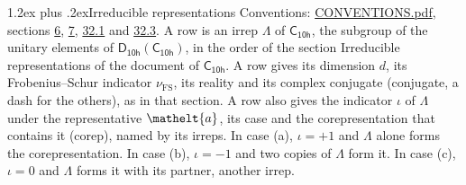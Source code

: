 \documentclass[10pt,a4paper]{article}
\makeatletter
\renewcommand\section{\@startsection{section}{1}{\z@}{-3ex plus -1ex minus -.2ex}%
  {1.2ex plus .2ex}{\normalfont\large\sffamily\bfseries\color{parttitle}}}
\numberwithin{equation}{section}
\newcommand{\eltfont}[1]{{\let\sigma\eltsigma\mathelt{#1}}}
\newcommand{\grp}[1]{\mathsf{#1}}
\newcommand{\elt}[1]{\eltfont{#1}}
\newcommand{\fsind}{\nu_{\mathrm{FS}}}
\makeatother
\begin{document}
\section{Irreducible representations}\label{s:irreps}
Conventions: \href{../../CONVENTIONS.pdf}{CONVENTIONS.pdf}, sections \href{../../../rotation/CONVENTIONS.pdf\#conv.6}{6}, \href{../../../rotation/CONVENTIONS.pdf\#conv.7}{7}, \href{../../CONVENTIONS.pdf\#conv.32.1}{32.1} and \href{../../CONVENTIONS.pdf\#conv.32.3}{32.3}.
\leavevmode\label{n:irrep.Delta}A row is an irrep $\Lambda$ of $\grp{C_{10h}}$, the subgroup of the unitary elements of $\grp{D_{10h}}(\grp{C_{10h}})$, in the order of the section Irreducible representations of the document of \href{../../../rotation/data/pdf/C10h.pdf}{$\grp{C_{10h}}$}. \label{n:index.dimension}\label{n:index.frobenius}\label{n:head.irrep}\label{n:head.reality}\label{n:head.conjugate}A row gives its dimension $d$, its Frobenius--Schur indicator $\fsind$, its reality and its complex conjugate (conjugate, a dash for the others), as in that section. \label{n:head.case.corep}\label{n:head.corep}A row also gives the indicator $\iota$ of $\Lambda$ under the representative $\elt{a}$, its case and the corepresentation that contains it (corep), named by its irreps. In case (a), $\iota = +1$ and $\Lambda$ alone forms the corepresentation. In case (b), $\iota = -1$ and two copies of $\Lambda$ form it. In case (c), $\iota = 0$ and $\Lambda$ forms it with its partner, another irrep.
\setlength{\emergencystretch}{2em}\par\setlength{\emergencystretch}{0pt}
\end{document}
